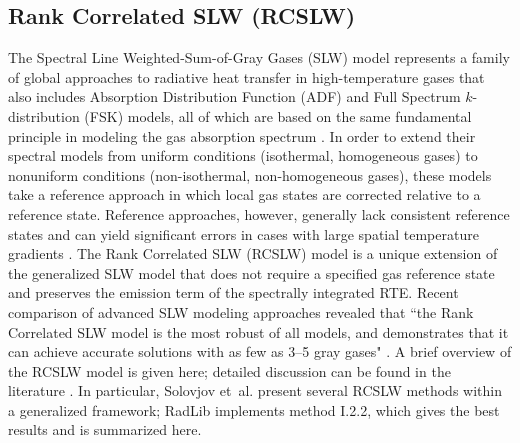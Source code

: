 \documentclass[preprint,12pt, a4paper]{elsarticle}
\begin{document}
\subsection{Rank Correlated SLW (RCSLW)} \label{s:RCSLW}

The Spectral Line Weighted-Sum-of-Gray Gases (SLW) model represents a family of global approaches to radiative heat transfer in high-temperature gases that also includes Absorption Distribution Function (ADF) and Full Spectrum $k$-distribution (FSK) models, all of which are based on the same fundamental principle in modeling the gas absorption spectrum \cite{Solovjov_2016}. In order to extend their spectral models from uniform conditions (isothermal, homogeneous gases) to nonuniform conditions (non-isothermal, non-homogeneous gases), these models take a reference approach in which local gas states are corrected relative to a reference state. Reference approaches, however, generally lack consistent reference states and can yield significant errors in cases with large spatial temperature gradients \cite{Solovjov_2017}. The Rank Correlated SLW (RCSLW) model is a unique extension of the generalized SLW model that does not require a specified gas reference state and preserves the emission term of the spectrally integrated RTE. 
%
Recent comparison of advanced SLW modeling approaches revealed that ``the Rank Correlated SLW model is the most robust of all models, and demonstrates that it can achieve accurate solutions with as few as 3–5 gray gases" \citep{Badger_2019}. A brief overview of the RCSLW model is given here; detailed discussion can be found in the literature \cite{Solovjov_2000, Solovjov_2001, Solovjov_2008, Solovjov_2011, Solovjov_2014, Solovjov_2016, Solovjov_2017, Webb_2018}. 
In particular, Solovjov et~al. \cite{Solovjov_2017} present several RCSLW methods within a generalized framework; RadLib implements method I.2.2, which gives the best results and is summarized here.
%









\end{document}
